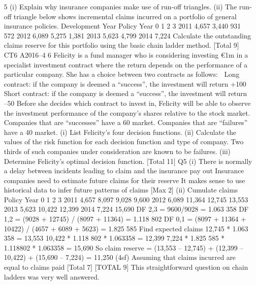 \documentclass[a4paper,12pt]{article}
\begin{document}
\begin{enumerate}
5 (i) Explain why insurance companies make use of run-off triangles. 
(ii) The run-off triangle below shows incremental claims incurred on a portfolio of
general insurance policies.
Development Year
Policy Year 0 1 2 3
2011 4,657 3,440 931 572
2012 6,089 5,275 1,381
2013 5,623 4,799
2014 7,224
Calculate the outstanding claims reserve for this portfolio using the basic
chain ladder method. 
[Total 9]
CT6 A2016–4
6 Felicity is a fund manager who is considering investing €1m in a specialist
investment contract where the return depends on the performance of a particular
company. She has a choice between two contracts as follows:
   Long contract: if the company is deemed a “success”, the investment will return
+100%
 Short contract: if the company is deemed a “success”, the investment will return
–50%
Before she decides which contract to invest in, Felicity will be able to observe the
investment performance of the company’s shares relative to the stock market.
Companies that are “successes” have a 60%
market. Companies that are “failures” have a 40%
market.
(i) List Felicity’s four decision functions. 
(ii) Calculate the values of the risk function for each decision function and type
of company. 
Two thirds of such companies under consideration are known to be failures.
(iii) Determine Felicity’s optimal decision function. 
[Total 11]
  Q5 (i) There is normally a delay between incidents leading to claim and the insurance
pay out 
Insurance companies need to estimate future claims for their reserve 
It makes sense to use historical data to infer future patterns of claims 
[Max 2]
(ii) Cumulate claims
Policy
Year
0 1 2 3
2011 4,657 8,097 9,028 9,600
2012 6,089 11,364 12,745 13,553
2013 5,623 10,422 12,399
2014 7,224 15,690
DF 2,3 = 9600/9028 = 1.063 358 
DF 1,2 = (9028 + 12745) / (8097 + 11364) = 1.118 802 
DF 0,1 = (8097 + 11364 + 10422) / (4657 + 6089 + 5623) = 1.825 585 
Find expected claims 12,745 * 1.063 358 = 13,553 
10,422 * 1.118 802 * 1.063358 = 12,399 
7,224 * 1.825 585 * 1.118802 * 1.063358 = 15,690 
So claim reserve =
  (13,553 – 12,745) + (12,399 – 10,422) + (15,690 – 7,224) = 11,250 (4sf) 
Assuming that claims incurred are equal to claims paid
[Total 7]
[TOTAL 9]
This straightforward question on chain ladders was very well answered.

\end{enumerate}
\end{document}
